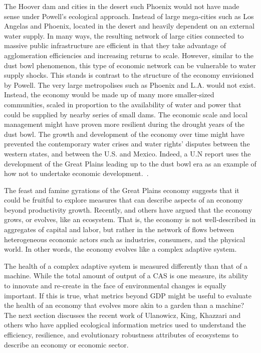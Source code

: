 \documentclass{article}
\begin{document}
The Hoover dam and cities in the desert such
Phoenix
would not have made sense under
Powell's ecological approach. 
Instead of large mega-cities such as
Los Angelas and Phoenix, located in 
the desert and heavily
dependent on an external water supply.
In many ways, the resulting network of large cities 
connected to massive public
infrastructure are efficient in that they 
take advantage of
agglomeration efficiencies and increasing
returns to scale. However, similar to the
dust bowl phenomenon, this type of
economic network can be vulnerable to water supply
shocks. 
This stands is contrast to the structure of the 
economy envisioned by Powell. The 
very large metropolises such as Phoenix
and L.A. would not exist. Instead, the economy
would be made up of many more smaller-sized communities,
scaled in proportion to the availability of 
water and power that could be supplied by
nearby series of small dams. The economic scale
and local management might have proven
more resilient  during 
the drought years of the dust bowl. The growth
and development of the economy over time might
have prevented
the contemporary water crises and water rights'
disputes between the western states, and between
the U.S. and Mexico. 
Indeed, a U.N report uses the development of the
Great Plains leading up to the dust bowl era as an
example of how not to undertake economic development.~\cite{kassass_drought_1987}.

The feast and famine gyrations of the Great Plains economy
suggests
that it could be fruitful to explore measures that 
can describe aspects of an economy beyond productivity
growth. Recently, \cite{arthur_complexity_1999} and 
others have argued that the economy grows, or evolves,
like an ecosystem. That is,
the economy is not well-described in aggregates of capital and labor,
but rather in the network of flows between heterogeneous
economic actors such as
industries, consumers, and the physical world. In other words,
the economy evolves like a complex adaptive system. 

The health of a complex adaptive system is measured 
differently than that of a machine. While the
total amount of output of a CAS is one measure, its
ability to innovate and re-create in the face of environmental
changes is equally important. 
If this is true, what metrics  
beyond GDP might be useful to evaluate the health of an
economy that evolves more akin to a garden than a machine?
The next section discusses the recent work of Ulanowicz, King, 
Khazzari and others who have applied ecological information metrics
used to understand the efficiency, resilience, and 
evolutionary robustness attributes of ecosystems
 to describe an economy or economic sector.
\end{document}
